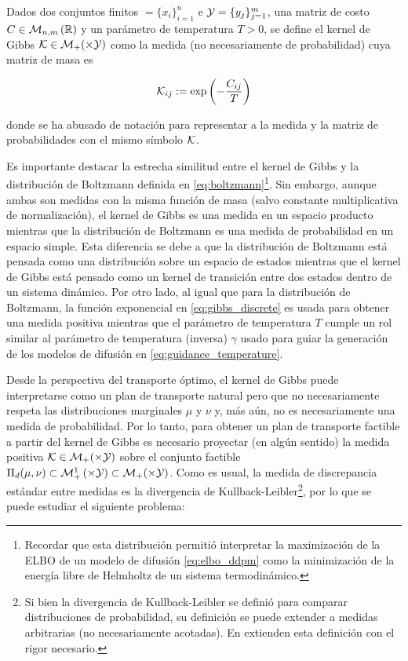 \begin{defn}
	Dados dos conjuntos finitos	$\xspace=\{x_i\}_{i=1}^n$ e $\mathcal{Y}=\{y_j\}_{j=1}^m$, una matriz de costo $C\in\mathcal{M}_{n,m}\left(\mathbb{R}\right)$ y un parámetro de temperatura $T>0$, se define el kernel de Gibbs $\mathcal{K}\in\mathcal{M}_+(\times\mathcal{Y})$ como la medida (no necesariamente de probabilidad) cuya matriz de masa es

	\begin{equation}
		\label{eq:gibbs_discrete}
		\mathcal{K}_{ij} := \exp\left(-\frac{C_{ij}}{T}\right)
	\end{equation}

	donde se ha abusado de notación para representar a la medida y la matriz de probabilidades con el mismo símbolo $\mathcal{K}$.
\end{defn}

Es importante destacar la estrecha similitud entre el kernel de Gibbs y la distribución de Boltzmann definida en \eqref{eq:boltzmann}\footnote{Recordar que esta distribución permitió interpretar la maximización de la ELBO de un modelo de difusión \eqref{eq:elbo_ddpm} como la minimización de la energía libre de Helmholtz de un sistema termodinámico.}. Sin embargo, aunque ambas son medidas con la misma función de masa (salvo constante multiplicativa de normalización), el kernel de Gibbs es una medida en un espacio producto mientras que la distribución de Boltzmann es una medida de probabilidad en un espacio simple. Esta diferencia se debe a que la distribución de Boltzmann está pensada como una distribución sobre un espacio de estados mientras que el kernel de Gibbs está pensado como un kernel de transición entre dos estados dentro de un sistema dinámico. Por otro lado, al igual que para la distribución de Boltzmann, la función exponencial en \eqref{eq:gibbs_discrete} es usada para obtener una medida positiva mientras que el parámetro de temperatura $T$ cumple un rol similar al parámetro de temperatura (inversa) $\gamma$ usado para guiar la generación de los modelos de difusión en \eqref{eq:guidance_temperature}.

Desde la perspectiva del transporte óptimo, el kernel de Gibbs puede interpretarse como un plan de transporte natural pero que no necesariamente respeta las distribuciones marginales $\mu$ y $\nu$ y, más aún, no es necesariamente una medida de probabilidad. Por lo tanto, para obtener un plan de transporte factible a partir del kernel de Gibbs es necesario proyectar (en algún sentido) la medida positiva $\mathcal{K}\in\mathcal{M}_+(\times\mathcal{Y})$ sobre el conjunto factible $\Pi_d(\mu,\nu)\subset\probmeasure{\xspace\times\yspace}\subset\mathcal{M}_+(\xspace\times\yspace)$. Como es usual, la medida de discrepancia estándar entre medidas es la divergencia de Kullback-Leibler\footnote{Si bien la divergencia de Kullback-Leibler se definió para comparar distribuciones de probabilidad, su definición se puede extender a medidas arbitrarias (no necesariamente acotadas). En \cite{léonard2013survey} extienden esta definición con el rigor necesario.}, por lo que se puede estudiar el siguiente problema:

